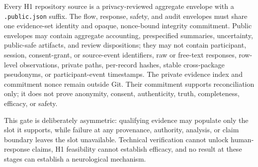 Every H1 repository source is a privacy-reviewed aggregate envelope with a
\texttt{.public.json} suffix. The flow, response, safety, and audit envelopes
must share one evidence-set identity and opaque, nonce-bound integrity commitment. Public
envelopes may contain aggregate accounting, prespecified summaries,
uncertainty, public-safe artifacts, and review dispositions; they may not
contain participant, session, consent-grant, or source-event identifiers, raw
or free-text responses, row-level observations, private paths, per-record
hashes, stable cross-package pseudonyms, or participant-event timestamps. The
private evidence index and commitment nonce remain outside Git. Their
commitment supports reconciliation only; it does not prove anonymity, consent,
authenticity, truth, completeness, efficacy, or safety.

This gate is deliberately asymmetric: qualifying evidence may populate only
the slot it supports, while failure at any provenance, authority, analysis, or
claim boundary leaves the slot unavailable. Technical verification cannot
unlock human-response claims, H1 feasibility cannot establish efficacy, and no
result at these stages can establish a neurological mechanism.
